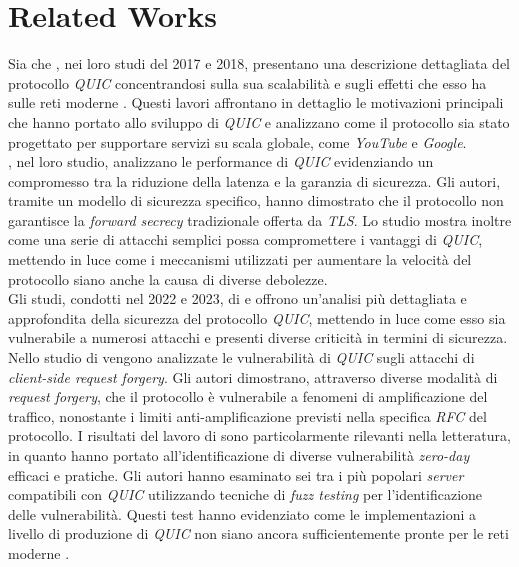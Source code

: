 \chapter{Related Works}
\label{cap:RelatedWorks}

Sia  che  , nei loro studi del 2017 e 2018, presentano una descrizione dettagliata
del protocollo \emph{QUIC} concentrandosi sulla sua scalabilità e sugli effetti che esso ha sulle reti moderne \cite{article:handshake,article:wild}.
Questi lavori affrontano in dettaglio le motivazioni principali che hanno portato allo sviluppo di \emph{QUIC} e analizzano come il protocollo sia stato progettato per 
supportare servizi su scala globale, come \emph{YouTube} e \emph{Google}. \\
, nel loro studio, analizzano le performance di \emph{QUIC} evidenziando un compromesso tra la riduzione della latenza e la garanzia di sicurezza.
Gli autori, tramite un modello di sicurezza specifico, hanno dimostrato che il protocollo non garantisce la \emph{forward secrecy} tradizionale offerta da \emph{TLS}.
Lo studio mostra inoltre come una serie di attacchi semplici possa compromettere i vantaggi di \emph{QUIC}, 
mettendo in luce come i meccanismi utilizzati per aumentare la velocità del protocollo siano anche la causa di diverse debolezze.
\\
Gli studi, condotti nel 2022 e 2023, di \citeauthor{article:QuicAtt} e  offrono un'analisi più dettagliata e approfondita
della sicurezza del protocollo \emph{QUIC}, mettendo in luce come esso sia vulnerabile a numerosi attacchi e presenti diverse criticità in termini di sicurezza.
Nello studio di  vengono analizzate le vulnerabilità di \emph{QUIC} sugli attacchi di \emph{client-side request forgery}. Gli autori dimostrano, attraverso diverse modalità di \emph{request forgery},
che il protocollo è vulnerabile a fenomeni di amplificazione del traffico, nonostante i limiti anti-amplificazione previsti nella specifica \emph{RFC} del protocollo.
I risultati del lavoro di \citeauthor{article:QuicAtt} sono particolarmente rilevanti nella letteratura, 
in quanto hanno portato all'identificazione di diverse vulnerabilità \emph{zero-day} efficaci e pratiche. 
Gli autori hanno esaminato sei tra i più popolari \emph{server} compatibili con \emph{QUIC} utilizzando tecniche di \emph{fuzz testing} per l'identificazione delle vulnerabilità.
Questi test hanno evidenziato come le implementazioni a livello di produzione di \emph{QUIC} non siano ancora sufficientemente pronte per le reti moderne \cite{article:QuicAtt,article:forge}.
